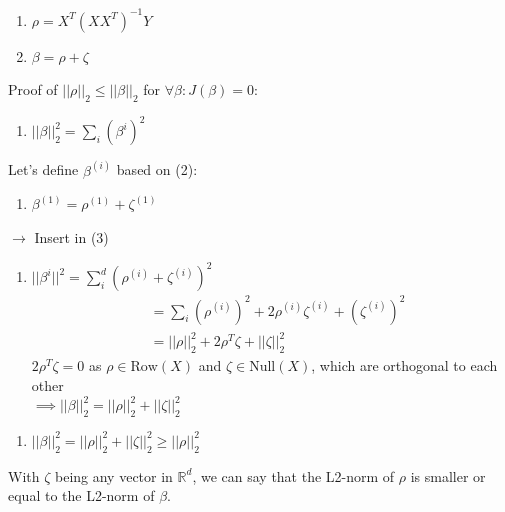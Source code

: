\begin{answer}
\begin{enumerate}
    \item[(1)] $\rho = X^T(XX^T)^{-1}Y$ \item[(2)] $\beta = \rho + \zeta$ \\
\end{enumerate}

Proof of $||\rho||_2 \leq ||\beta||_2$ for $\forall \beta : J(\beta) = 0$:
\begin{enumerate}
\item[(3)] $||\beta||_2^2 = \sum_i (\beta^{i})^2$
\end{enumerate}

Let's define $\beta^{(i)}$ based on (2):

\begin{enumerate}
\item[(2*)] $\beta^{(1)} = \rho^{(1)} + \zeta^{(1)}$
\end{enumerate}
$\longrightarrow$ Insert in (3)
\begin{enumerate}
\item[(4)] $||\beta^i||^2 = \sum_i^d (\rho^{(i)} + \zeta^{(i)})^2$
\begin{align*}
&= \sum_i (\rho^{(i)})^2 + 2\rho^{(i)}\zeta^{(i)} + (\zeta^{(i)})^2 \\
&= ||\rho||_2^2 + 2\rho^T\zeta + ||\zeta||_2^2
\end{align*}
$2\rho^T\zeta = 0$ as $\rho \in \text{Row}(X)$ and $\zeta \in \text{Null}(X)$, which are orthogonal to each other\\
$\implies ||\beta||_2^2 = ||\rho||_2^2 + ||\zeta||_2^2$
\end{enumerate}
\begin{enumerate}
\item[(4*)] $||\beta||_2^2 = ||\rho||_2^2 + ||\zeta||_2^2 \geq ||\rho||_2^2$
\end{enumerate}

With $\zeta$ being any vector in $\mathbb{R}^d$, we can say that the L2-norm of $\rho$ is smaller or equal to the L2-norm of $\beta$.

\end{answer}